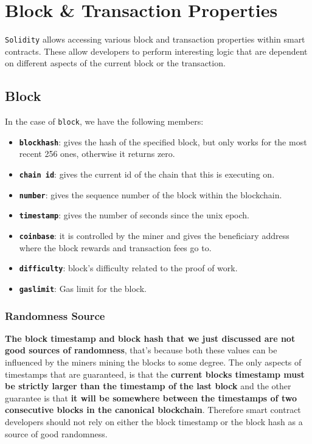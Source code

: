 \section{Block \& Transaction
Properties}\label{block-transaction-properties}

\texttt{Solidity} allows accessing various block and transaction
properties within smart contracts. These allow developers to perform
interesting logic that are dependent on different aspects of the current
block or the transaction.

\subsection{Block}\label{block}

In the case of \texttt{block}, we have the following members:

\begin{itemize}
\tightlist
\item
  \textbf{\texttt{blockhash}}: gives the hash of the specified block,
  but only works for the most recent 256 ones, otherwise it returns
  zero.
\item
  \textbf{\texttt{chain\ id}}: gives the current id of the chain that
  this is executing on.
\item
  \textbf{\texttt{number}}: gives the sequence number of the block
  within the blockchain.
\item
  \textbf{\texttt{timestamp}}: gives the number of seconds since the
  unix epoch.
\item
  \textbf{\texttt{coinbase}}: it is controlled by the miner and gives
  the beneficiary address where the block rewards and transaction fees
  go to.
\item
  \textbf{\texttt{difficulty}}: block's difficulty related to the proof
  of work.
\item
  \textbf{\texttt{gaslimit}}: Gas limit for the block.
\end{itemize}

\subsubsection{Randomness Source}\label{randomness-source}

\textbf{The block timestamp and block hash that we just discussed are
not good sources of randomness}, that's because both these values can be
influenced by the miners mining the blocks to some degree. The only
aspects of timestamps that are guaranteed, is that the \textbf{current
blocks timestamp must be strictly larger than the timestamp of the last
block} and the other guarantee is that \textbf{it will be somewhere
between the timestamps of two consecutive blocks in the canonical
blockchain}. Therefore smart contract developers should not rely on
either the block timestamp or the block hash as a source of good
randomness.


